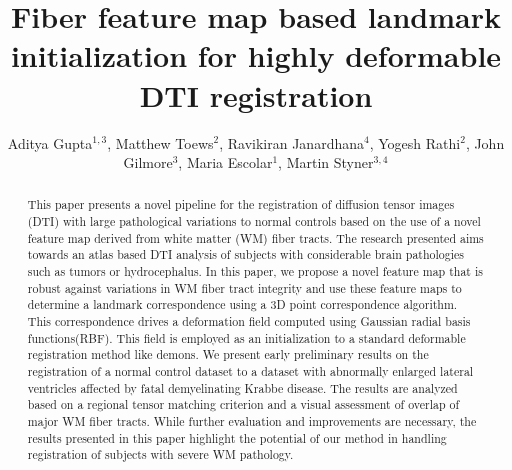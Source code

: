 \documentclass{llncs}
\begin{document}
%
\frontmatter          %
%
\pagestyle{headings}  %
\mainmatter              %
%
\title{Fiber feature map based landmark initialization for highly deformable DTI registration}
\author{Aditya Gupta$^{1,3}$, Matthew Toews$^{2}$, Ravikiran Janardhana$^{4}$, Yogesh Rathi$^{2}$, John Gilmore$^{3}$, Maria Escolar$^{1}$, Martin Styner$^{3,4}$}




\maketitle              %


\begin{abstract}
This paper presents a novel pipeline for the registration of diffusion tensor images (DTI) with large pathological variations to normal controls based on the use of a novel feature map derived from white matter (WM) fiber tracts. The research presented aims towards an atlas based DTI analysis of subjects with considerable brain pathologies such as  tumors or hydrocephalus. In this paper, we propose a novel feature map that is robust against variations in WM fiber tract integrity and use these feature maps to determine a landmark correspondence using a 3D point correspondence algorithm. This correspondence drives a deformation field computed using Gaussian radial basis functions(RBF). This field is employed as an initialization to a standard deformable registration method like demons. We present early preliminary results on  the registration of a normal control dataset to a dataset with abnormally enlarged lateral ventricles affected by  fatal demyelinating Krabbe disease. The results are analyzed based on a regional tensor matching criterion and a visual assessment of overlap of major WM fiber tracts. While further evaluation and improvements are necessary, the results presented in this paper highlight the potential of our method in handling registration of subjects with severe WM pathology.

\end{abstract}
\end{document}
